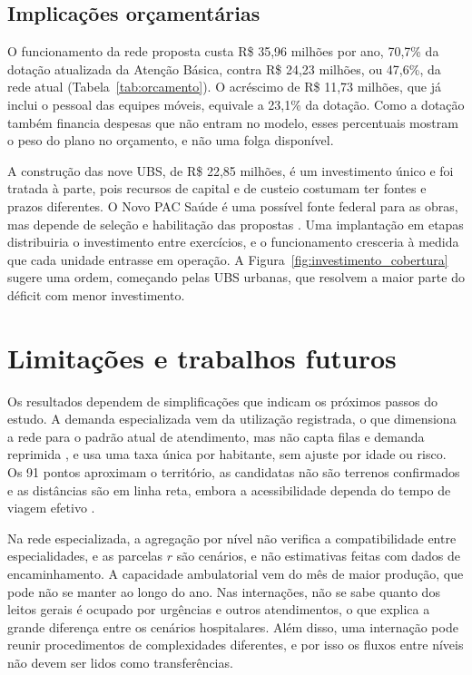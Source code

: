 \documentclass[12pt,a4paper,oneside]{report}
\begin{document}
\subsection{Implicações orçamentárias}
O funcionamento da rede proposta custa R\$ 35,96 milhões por ano, 70,7\% da dotação atualizada da
Atenção Básica, contra R\$ 24,23 milhões, ou 47,6\%, da rede atual (Tabela~\ref{tab:orcamento}). O
acréscimo de R\$ 11,73 milhões, que já inclui o pessoal das equipes móveis, equivale a 23,1\% da dotação.
Como a dotação também financia despesas que não entram no modelo, esses percentuais mostram o peso do
plano no orçamento, e não uma folga disponível.

A construção das nove UBS, de R\$ 22,85 milhões, é um investimento único e foi tratada à parte, pois
recursos de capital e de custeio costumam ter fontes e prazos diferentes. O Novo PAC Saúde é uma possível
fonte federal para as obras, mas depende de seleção e habilitação das propostas
\citep{pacselecao2025,novopac2025}. Uma implantação em etapas distribuiria o investimento entre
exercícios, e o funcionamento cresceria à medida que cada unidade entrasse em operação. A
Figura~\ref{fig:investimento_cobertura} sugere uma ordem, começando pelas UBS urbanas, que resolvem a
maior parte do déficit com menor investimento.

\section{Limitações e trabalhos futuros}
Os resultados dependem de simplificações que indicam os próximos passos do estudo. A demanda
especializada vem da utilização registrada, o que dimensiona a rede para o padrão atual de atendimento,
mas não capta filas e demanda reprimida \citep{santana2023}, e usa uma taxa única por habitante, sem
ajuste por idade ou risco. Os 91 pontos aproximam o território, as candidatas não são terrenos
confirmados e as distâncias são em linha reta, embora a acessibilidade dependa do tempo de viagem
efetivo \citep{aday1974}.

Na rede especializada, a agregação por nível não verifica a compatibilidade entre especialidades, e as
parcelas $r$ são cenários, e não estimativas feitas com dados de encaminhamento. A capacidade
ambulatorial vem do mês de maior produção, que pode não se manter ao longo do ano. Nas internações, não
se sabe quanto dos leitos gerais é ocupado por urgências e outros atendimentos, o que explica a grande
diferença entre os cenários hospitalares. Além disso, uma internação pode reunir procedimentos de
complexidades diferentes, e por isso os fluxos entre níveis não devem ser lidos como transferências.
\end{document}
